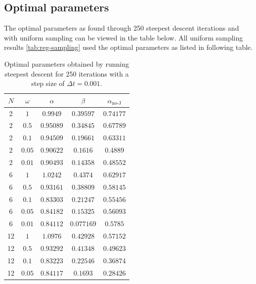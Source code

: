 \documentclass[11pt]{article}
\begin{document}
\subsection{Optimal parameters}
The optimal parameters as found through 250 steepest descent iterations and with uniform sampling can be viewed in the table below. All uniform sampling results \ref{tab:reg-sampling} used the optimal parameters as listed in following table.

\begin{table}[H]
	\centering
	\caption{Optimal parameters obtained by running steepest descent for 250 iterations with a step size of $\Delta t = 0.001$.}
	\begin{tabular}{c c c c c}
		\\ \hline \hline
		$N$ &       $\omega$ &       $\alpha$ &        $\beta$ &$\alpha_\text{no-J}$ \\ \hline
		2 &$              1$ &$         0.9949$ &$        0.39597$ &$        0.74177$ \\ 
		2 &$            0.5$ &$        0.95089$ &$        0.34845$ &$        0.67789$ \\ 
		2 &$            0.1$ &$        0.94509$ &$        0.19661$ &$        0.63311$ \\ 
		2 &$           0.05$ &$        0.90622$ &$         0.1616$ &$         0.4889$ \\ 
		2 &$           0.01$ &$        0.90493$ &$        0.14358$ &$        0.48552$ \\ 
		6 &$              1$ &$         1.0242$ &$         0.4374$ &$        0.62917$ \\ 
		6 &$            0.5$ &$        0.93161$ &$        0.38809$ &$        0.58145$ \\ 
		6 &$            0.1$ &$        0.83303$ &$        0.21247$ &$        0.55456$ \\ 
		6 &$           0.05$ &$        0.84182$ &$        0.15325$ &$        0.56093$ \\ 
		6 &$           0.01$ &$        0.84112$ &$       0.077169$ &$         0.5785$ \\ 
		12 &$              1$ &$         1.0976$ &$        0.42928$ &$        0.57152$ \\ 
		12 &$            0.5$ &$        0.93292$ &$        0.41348$ &$        0.49623$ \\ 
		12 &$            0.1$ &$        0.83223$ &$        0.22546$ &$        0.36874$ \\ 
		12 &$           0.05$ &$        0.84117$ &$         0.1693$ &$        0.28426$ \\ 

\end{tabular}
\end{table}
\end{document}
